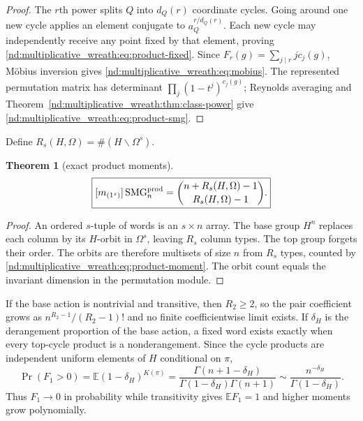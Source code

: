 \documentclass[10pt]{article}
\newcommand{\SMG}{\operatorname{SMG}}
\newcommand{\MGF}{\SMG}
\newcommand{\E}{\mathbb E}
\newtheorem{theorem}{Theorem}
\begin{document}
\begin{proof}
The $r$th power splits $Q$ into $d_Q(r)$ coordinate cycles.  Going around one
new cycle applies an element conjugate to $a_Q^{r/d_Q(r)}$.  Each new cycle
may independently receive any point fixed by that element, proving
\eqref{nd:multiplicative_wreath:eq:product-fixed}.  Since
$F_r(g)=\sum_{j\mid r}j c_j(g)$, M\"obius inversion gives
\eqref{nd:multiplicative_wreath:eq:mobius}.  The represented permutation matrix has determinant
$\prod_j(1-t^j)^{c_j(g)}$; Reynolds averaging and
Theorem~\ref{nd:multiplicative_wreath:thm:class-power} give \eqref{nd:multiplicative_wreath:eq:product-smg}.
\end{proof}

Define $R_s(H,\Omega)=\#(H\backslash\Omega^s)$.

\begin{theorem}[exact product moments]\label{nd:multiplicative_wreath:thm:product-moment}
\begin{equation}\label{nd:multiplicative_wreath:eq:product-moment}
 \boxed{[m_{(1^s)}]\MGF^{\rm prod}_n
 =\binom{n+R_s(H,\Omega)-1}{R_s(H,\Omega)-1}.}
\end{equation}
\end{theorem}

\begin{proof}
An ordered $s$-tuple of words is an $s\times n$ array.  The base group $H^n$
replaces each column by its $H$-orbit in $\Omega^s$, leaving $R_s$ column
types.  The top group forgets their order.  The orbits are therefore
multisets of size $n$ from $R_s$ types, counted by \eqref{nd:multiplicative_wreath:eq:product-moment}.
The orbit count equals the invariant dimension in the permutation module.
\end{proof}

If the base action is nontrivial and transitive, then $R_2\ge2$, so the pair
coefficient grows as $n^{R_2-1}/(R_2-1)!$ and no finite coefficientwise limit
exists.  If $\delta_H$ is the derangement proportion of the base action, a
fixed word exists exactly when every top-cycle product is a nonderangement.
Since the cycle products are independent uniform elements of $H$ conditional
on $\pi$,
\begin{equation}\label{nd:multiplicative_wreath:eq:product-rare}
 \Pr(F_1>0)=\E(1-\delta_H)^{K(\pi)}
 =\frac{\Gamma(n+1-\delta_H)}
 {\Gamma(1-\delta_H)\Gamma(n+1)}
 \sim\frac{n^{-\delta_H}}{\Gamma(1-\delta_H)}.
\end{equation}
Thus $F_1\to0$ in probability while transitivity gives $\E F_1=1$ and higher
moments grow polynomially.
\end{document}
